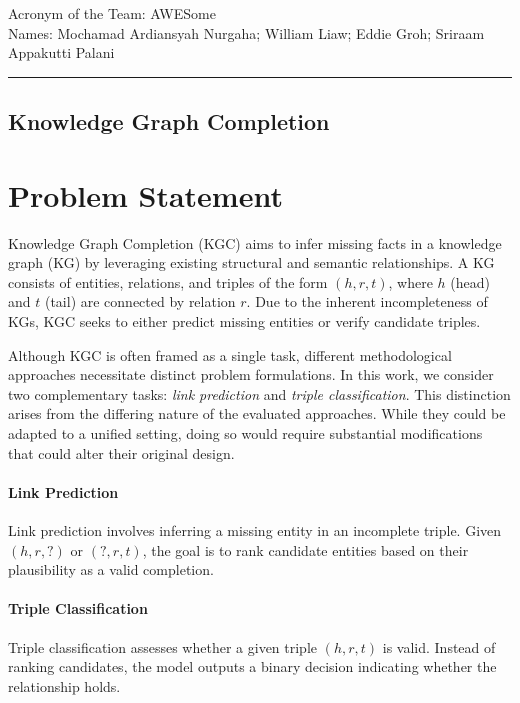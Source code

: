 \documentclass[12pt,a4paper]{article}
\begin{document}
\noindent Acronym of the Team: AWESome\\
Names: Mochamad Ardiansyah Nurgaha; William Liaw; Eddie Groh; Sriraam Appakutti Palani

    {\centering\rule{\linewidth}{.5pt}}

\begin{center}
    \section*{Knowledge Graph Completion}
\end{center}


%
%

\section{Problem Statement}\label{sec:problem-statement}

Knowledge Graph Completion (KGC) aims to infer missing facts in a knowledge graph (KG) by leveraging existing structural and semantic relationships.
A KG consists of entities, relations, and triples of the form \( (h, r, t) \), where \( h \) (head) and \( t \) (tail) are connected by relation \( r \).
Due to the inherent incompleteness of KGs, KGC seeks to either predict missing entities or verify candidate triples.

Although KGC is often framed as a single task, different methodological approaches necessitate distinct problem formulations.
In this work, we consider two complementary tasks: \emph{link prediction} and \emph{triple classification}.
This distinction arises from the differing nature of the evaluated approaches.
While they could be adapted to a unified setting, doing so would require substantial modifications that could alter their original design.

\paragraph{Link Prediction}
Link prediction involves inferring a missing entity in an incomplete triple. Given \( (h, r, ?) \) or \( (?, r, t) \), the goal is to rank candidate entities based on their plausibility as a valid completion.

\paragraph{Triple Classification}
Triple classification assesses whether a given triple \( (h, r, t) \) is valid. Instead of ranking candidates, the model outputs a binary decision indicating whether the relationship holds.
\\
\end{document}
